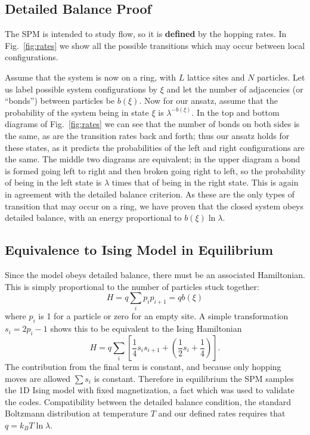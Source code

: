 \documentclass[
reprint, amsmath,amssymb, aps,
 pre, longbibliography,
]{revtex4-1}
\begin{document}
\subsection{Detailed Balance Proof} 
The SPM is intended to study flow, so it is {\bf defined} by the
hopping rates.  In Fig.~\ref{fig:rates} we
show all the possible transitions which may occur between local
configurations. 

Assume that the system is now on a ring, with $L$
lattice sites and $N$ particles.  Let us label possible system
configurations by $\xi$ and let the number of adjacencies (or
``bonds'') between particles be $b(\xi)$. Now for our ansatz, assume
that the probability of the system being in state $\xi$ is
$\lambda^{-b(\xi)}$.  In the top and bottom diagrams of
Fig.~\ref{fig:rates} we can see that the number of bonds on
both sides is the same, as are the transition rates back and forth;
thus our ansatz holds for these states, as it predicts the
probabilities of the left and right configurations are the same. The
middle two diagrams are equivalent; in the upper diagram a
bond is formed going left to right and then broken going right to
left, so the probability of being in the left state is $\lambda$ times
that of being in the right state. This is again in agreement with the
detailed balance criterion. As these are the only types of transition
that may occur on a ring, we have proven that the closed system obeys
detailed balance, with an energy proportional to $b(\xi) \ln {\lambda}$.

\subsection{Equivalence to Ising Model in Equilibrium}

Since the model obeys detailed balance, there must be an associated
Hamiltonian.  This is simply proportional to the number of particles stuck together:
\begin{equation}
 H = q \sum_i p_ip_{i+1} = q b(\xi)
\end{equation}
where $p_i$ is 1 for a particle or zero for an empty site.  A simple
transformation $s_i = 2p_i-1$ shows this to be equivalent to the Ising
Hamiltonian
\begin{equation}
 H = q \sum_i \left[ \frac{1}{4} s_i s_{i+1} + \left( \frac{1}{2} s_i + \frac{1}{4} \right) \right].
\end{equation}
The contribution from the final term is constant, and because only hopping moves are allowed
$\sum s_i$ is constant\cite{PhysRev.145.224}. 
Therefore in equilibrium the SPM samples the 1D
Ising model with fixed magnetization, a fact which was used to
validate the codes. Compatibility between the detailed balance condition, the standard Boltzmann distribution at temperature $T$ and our defined rates requires that $q = k_B T\ln{\lambda} $.
\end{document}
